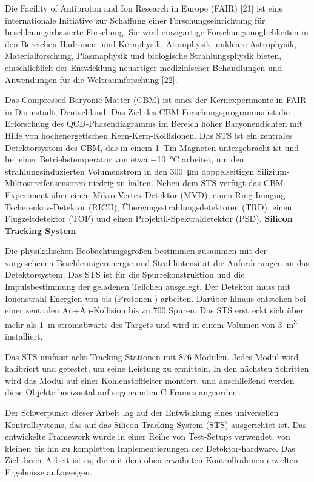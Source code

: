 Die Facility of Antiproton and Ion Research in Europe (FAIR) [21] ist eine internationale Initiative zur Schaffung einer Forschungseinrichtung für beschleunigerbasierte Forschung. Sie wird einzigartige Forschungsmöglichkeiten in den Bereichen Hadronen- und Kernphysik, Atomphysik, nukleare Astrophysik, Materialforschung, Plasmaphysik und biologische Strahlungsphysik bieten, einschließlich der Entwicklung neuartiger medizinischer Behandlungen und Anwendungen für die Weltraumforschung [22].

Das Compressed Baryonic Matter (CBM) ist eines der Kernexperimente in FAIR in Darmstadt, Deutschland. Das Ziel des CBM-Forschungsprogramms ist die Erforschung des QCD-Phasendiagramms im Bereich hoher Baryonendichten mit Hilfe von hochenergetischen Kern-Kern-Kollisionen. Das \gls{STS} ist ein zentrales Detektorsystem des CBM, das in einem 1~Tm-Magneten untergebracht ist und bei einer Betriebstemperatur von etwa \SI{-10}{\celsius} arbeitet, um den strahlungsinduzierten Volumenstrom in den \SI{300}{\micro\metre} doppelseitigen Silizium-Mikrostreifensensoren niedrig zu halten. Neben dem \gls{STS} verfügt das CBM-Experiment über einen Mikro-Vertex-Detektor (MVD), einen Ring-Imaging-Tscherenkov-Detektor (RICH), Übergangsstrahlungsdetektoren (TRD), einen Flugzeitdetektor (TOF) und einen Projektil-Spektraldetektor (PSD).
\bigbreak
\textbf{Silicon Tracking System}
\bigbreak

Die physikalischen Beobachtungsgrößen bestimmen zusammen mit der vorgesehenen Beschleunigerenergie und Strahlintensität die Anforderungen an das Detektorsystem. Das \gls{STS} ist für die Spurrekonstruktion und die Impulsbestimmung der geladenen Teilchen ausgelegt. Der Detektor muss mit Ionenstrahl-Energien von  bis  (Protonen ) arbeiten. Darüber hinaus entstehen bei einer zentralen Au+Au-Kollision bis zu 700 Spuren. Das \gls{STS} erstreckt sich über mehr als \SI{1}{\meter} stromabwärts des Targets und wird in einem Volumen von \SI{3}{\cubic\meter} installiert. 

Das \gls{STS} umfasst acht Tracking-Stationen mit 876 Modulen. Jedes Modul wird kalibriert und getestet, um seine Leistung zu ermitteln. In den nächsten Schritten wird das Modul auf einer Kohlenstoffleiter montiert, und anschließend werden diese Objekte horizontal auf sogenannten C-Frames angeordnet. 

Der Schwerpunkt dieser Arbeit lag auf der Entwicklung eines universellen Kontrollsystems, das auf das Silicon Tracking System (\gls{STS}) ausgerichtet ist. Das entwickelte Framework wurde in einer Reihe von Test-Setups verwendet, von kleinen bis hin zu kompletten Implementierungen der Detektor-hardware. Das Ziel dieser Arbeit ist es, die mit dem oben erwähnten Kontrollrahmen erzielten Ergebnisse aufzuzeigen.

